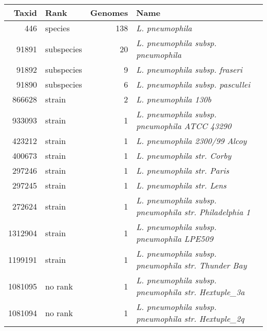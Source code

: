 \begin{tabular}{rlrl}
\hline
 Taxid & Rank & Genomes & Name\\\hline
446 & species & 138 & \emph{L. pneumophila}\\
91891 & subspecies & 20 & \emph{L. pneumophila subsp. pneumophila}\\
91892 & subspecies & 9 & \emph{L. pneumophila subsp. fraseri}\\
91890 & subspecies & 6 & \emph{L. pneumophila subsp. pascullei}\\
866628 & strain & 2 & \emph{L. pneumophila 130b}\\
933093 & strain & 1 & \emph{L. pneumophila subsp. pneumophila ATCC 43290}\\
423212 & strain & 1 & \emph{L. pneumophila 2300/99 Alcoy}\\
400673 & strain & 1 & \emph{L. pneumophila str. Corby}\\
297246 & strain & 1 & \emph{L. pneumophila str. Paris}\\
297245 & strain & 1 & \emph{L. pneumophila str. Lens}\\
272624 & strain & 1 & \emph{L. pneumophila subsp. pneumophila str. Philadelphia 1}\\
1312904 & strain & 1 & \emph{L. pneumophila subsp. pneumophila LPE509}\\
1199191 & strain & 1 & \emph{L. pneumophila subsp. pneumophila str. Thunder Bay}\\
1081095 & no rank & 1 & \emph{L. pneumophila subsp. pneumophila str. Hextuple\_3a}\\
1081094 & no rank & 1 & \emph{L. pneumophila subsp. pneumophila str. Hextuple\_2q}\\
\hline
\end{tabular}      
